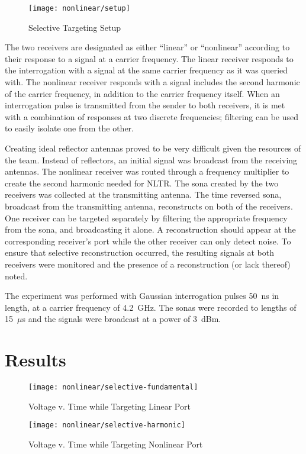 \begin{figure}[t]
\centering
\texttt{[image: nonlinear/setup]}
    \caption[Selective Targeting Setup]{Selective Targeting Setup}
    \label{fig:selective-setup}
\end{figure}

The two receivers are designated as either ``linear'' or ``nonlinear'' according to their response to a signal at a carrier frequency. The linear receiver responds to the interrogation with a signal at the same carrier frequency as it was queried with. The nonlinear receiver responds with a signal includes the second harmonic of the carrier frequency, in addition to the carrier frequency itself. When an interrogation pulse is transmitted from the sender to both receivers, it is met with a combination of responses at two discrete frequencies; filtering can be used to easily isolate one from the other.

Creating ideal reflector antennas proved to be very difficult given the resources of the team.  Instead of reflectors, an initial signal was broadcast from the receiving antennas.  The nonlinear receiver was routed through a frequency multiplier to create the second harmonic needed for NLTR.  The sona created by the two receivers was collected at the transmitting antenna.  The time reversed sona, broadcast from the transmitting antenna, reconstructs on both of the receivers.  One receiver can be targeted separately by filtering the appropriate frequency from the sona, and broadcasting it alone. A reconstruction should appear at the corresponding receiver's port while the other receiver can only detect noise. To ensure that selective reconstruction occurred, the resulting signals at both receivers were monitored and the presence of a reconstruction (or lack thereof) noted. 

The experiment was performed with Gaussian interrogation pulses 50~ns in length, at a carrier frequency of 4.2~GHz. The sonas were recorded to lengths of 15~$\mu$s and the signals were broadcast at a power of 3~dBm.

\section{Results}
\label{sec:selective-results}

\begin{figure}[h]
\centering
\texttt{[image: nonlinear/selective-fundamental]}
    \caption[Selective Targeting Linear Port]{Voltage v. Time while Targeting Linear Port}
    \label{fig:selective-fundamental}
\end{figure}
\begin{figure}[h]
\centering
\texttt{[image: nonlinear/selective-harmonic]}
    \caption[Selective Targeting Nonlinear Port]{Voltage v. Time while Targeting Nonlinear Port}
    \label{fig:selective-harmonic}
\end{figure}

